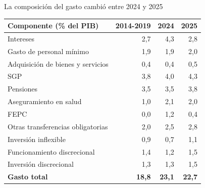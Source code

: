 \begin{frame}{La composición del gasto cambió entre 2024 y 2025}
\centering
\scriptsize
\begin{tabular}{lrrr}
\toprule
\textbf{Componente (\% del PIB)} & \textbf{2014-2019} & \textbf{2024} & \textbf{2025} \\
\midrule
Intereses                         & 2,7 & 4,3 & 2,8 \\
Gasto de personal mínimo          & 1,9 & 1,9 & 2,0 \\
Adquisición de bienes y servicios & 0,4 & 0,4 & 0,5 \\
SGP                               & 3,8 & 4,0 & 4,3 \\
Pensiones                         & 3,5 & 3,5 & 3,8 \\
Aseguramiento en salud            & 1,0 & 2,1 & 2,0 \\
FEPC                              & 0,0 & 1,2 & 0,4 \\
Otras transferencias obligatorias & 2,0 & 2,5 & 2,8 \\
Inversión inflexible              & 0,9 & 0,7 & 1,1 \\
Funcionamiento discrecional       & 1,4 & 1,2 & 1,5 \\
Inversión discrecional            & 1,3 & 1,3 & 1,5 \\
\midrule
\textbf{Gasto total}              & \textbf{18,8} & \textbf{23,1} & \textbf{22,7} \\
\bottomrule
\end{tabular}
\end{frame}